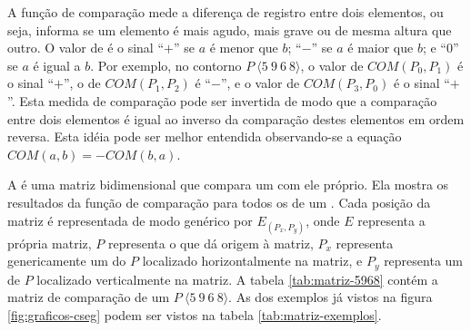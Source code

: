 A função de comparação  mede a diferença de registro entre
dois elementos, ou seja, informa se um elemento é mais agudo, mais
grave ou de mesma altura que outro. O valor de  é o sinal
``$+$'' se $a$ é menor que $b$; ``$-$'' se $a$ é maior que $b$; e
``$0$'' se $a$ é igual a $b$. Por exemplo, no contorno
$P\:\langle5\:9\:6\:8\rangle$, o valor de $COM(P_0,P_1)$ é o sinal
``$+$'', o de $COM(P_1,P_2)$ é ``$-$'', e o valor de $COM(P_3,P_0)$ é
o sinal ``$+$''. Esta medida de comparação pode ser invertida de modo
que a comparação entre dois elementos é igual ao inverso da comparação
destes elementos em ordem reversa. Esta idéia pode ser melhor
entendida observando-se a equação $COM(a,b)=-COM(b,a)$.

A  é uma matriz bidimensional que compara um
 com ele próprio. Ela mostra os resultados da função de
comparação  para todos os  de um
. Cada posição da matriz é representada de modo genérico
por $E_(P_x,P_y)$, onde $E$ representa a própria matriz, $P$
representa o  que dá origem à matriz, $P_x$ representa
genericamente um  do  $P$ localizado
horizontalmente na matriz, e $P_y$ representa um  de
$P$ localizado verticalmente na matriz. A tabela \ref{tab:matriz-5968}
contém a matriz de comparação de um 
$P\:\langle5\:9\:6\:8\rangle$. As  dos exemplos já
vistos na figura \ref{fig:graficos-cseg} podem ser vistos na tabela
\ref{tab:matriz-exemplos}.

